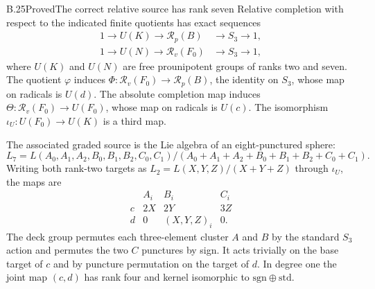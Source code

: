 \begin{statement}{B.25}{Proved}{The correct relative source has rank seven}
Relative completion with respect to the indicated finite quotients has
exact sequences
\[
 \begin{aligned}
 1\longrightarrow U(K)\longrightarrow\mathscr R_p(B)
       &\longrightarrow S_3\longrightarrow1,\\
 1\longrightarrow U(N)\longrightarrow\mathscr R_v(F_0)
       &\longrightarrow S_3\longrightarrow1,
 \end{aligned}
\]
where $U(K)$ and $U(N)$ are free prounipotent groups of ranks two and
seven. The quotient $\varphi$ induces
$\Phi:\mathscr R_v(F_0)\to\mathscr R_p(B)$, the identity on $S_3$,
whose map on radicals is $U(d)$. The absolute completion map induces
$\Theta:\mathscr R_v(F_0)\to U(F_0)$, whose map on radicals is $U(c)$.
The isomorphism $\iota_U:U(F_0)\to U(K)$ is a third map.

The associated graded source is the Lie algebra of an eight-punctured
sphere:
\[
 L_7=L(A_0,A_1,A_2,B_0,B_1,B_2,C_0,C_1)
       /(A_0+A_1+A_2+B_0+B_1+B_2+C_0+C_1).
\]
Writing both rank-two targets as $L_2=L(X,Y,Z)/(X+Y+Z)$ through
$\iota_U$, the maps are
\[
 \begin{array}{c|ccc}
       & A_i&B_i&C_i\\ \hline
 c     &2X&2Y&3Z\\
 d     &0&(X,Y,Z)_i&0.
 \end{array}
\]
The deck group permutes each three-element cluster $A$ and $B$ by
the standard $S_3$ action and permutes the two $C$ punctures by sign.
It acts trivially on the base target of $c$ and by puncture permutation
on the target of $d$. In degree one the joint map $(c,d)$ has rank four
and kernel isomorphic to $\mathrm{sgn}\oplus\mathrm{std}$.
\end{statement}
